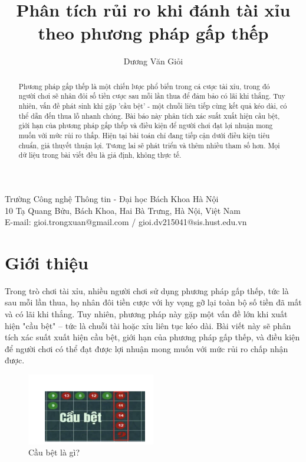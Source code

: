 \documentclass[a4paper,12pt]{article}
\title{Phân tích rủi ro khi đánh tài xỉu theo phương pháp gấp thếp}
\author{Dương Văn Giỏi}
\date{}
\begin{document}
\maketitle

\begin{center}
    Trường Công nghệ Thông tin - Đại học Bách Khoa Hà Nội \\
    10 Tạ Quang Bửu, Bách Khoa, Hai Bà Trưng, Hà Nội, Việt Nam \\
    E-mail: gioi.trongxuan@gmail.com / gioi.dv215041@sis.hust.edu.vn
\end{center}

\begin{abstract}
    Phương pháp gấp thếp là một chiến lược phổ biến trong cá cược tài xỉu, trong đó người chơi sẽ nhân đôi số tiền cược sau mỗi lần thua để đảm bảo có lãi khi thắng. Tuy nhiên, vấn đề phát sinh khi gặp 'cầu bệt' - một chuỗi liên tiếp cùng kết quả kéo dài, có thể dẫn đến thua lỗ nhanh chóng. Bài báo này phân tích xác suất xuất hiện cầu bệt, giới hạn của phương pháp gấp thếp và điều kiện để người chơi đạt lợi nhuận mong muốn với mức rủi ro thấp. Hiện tại bài toán chỉ đang tiếp cận dưới điều kiện tiêu chuẩn, giả thuyết thuận lợi. Tương lai sẽ phát triển và thêm nhiều tham số hơn. Mọi dữ liệu trong bài viết đều là giả định, không thực tế.
\end{abstract}

\tableofcontents

\section{Giới thiệu}
Trong trò chơi tài xỉu, nhiều người chơi sử dụng phương pháp gấp thếp, tức là sau mỗi lần thua, họ nhân đôi tiền cược với hy vọng gỡ lại toàn bộ số tiền đã mất và có lãi khi thắng. Tuy nhiên, phương pháp này gặp một vấn đề lớn khi xuất hiện "cầu bệt" – tức là chuỗi tài hoặc xỉu liên tục kéo dài. Bài viết này sẽ phân tích xác suất xuất hiện cầu bệt, giới hạn của phương pháp gấp thếp, và điều kiện để người chơi có thể đạt được lợi nhuận mong muốn với mức rủi ro chấp nhận được.

\begin{figure}[h]
    \centering
    \includegraphics[width=0.5\textwidth]{cau_bet.png}
    \caption{Cầu bệt là gì?}
\end{figure}
\end{document}
